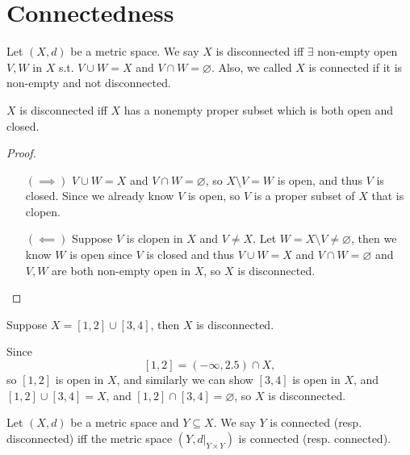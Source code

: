 \section{Connectedness}
\begin{definition} \label{def: disconnected/connected}
    Let \((X, d)\) be a metric space. We say \(X\) is disconnected iff \(\exists \) non-empty open \(V, W\) in \(X\) s.t. \(V \cup W = X\) and \(V \cap W = \varnothing \). Also, we called \(X\) is connected if it is non-empty and not disconnected.       
\end{definition}

\begin{remark}
    \(X\) is disconnected iff \(X\) has a nonempty proper subset which is both open and closed.  
\end{remark}
\begin{proof}
    \vphantom{text}
    \begin{itemize}
        \item [\((\implies )\)] \(V \cup W = X\) and \(V \cap W = \varnothing \), so \(X \setminus V = W\) is open, and thus \(V\) is closed. Since we already know \(V\) is open, so \(V\) is a proper subset of \(X\) that is clopen. 
        \item [\((\impliedby )\)] Suppose \(V\) is clopen in \(X\) and \(V \neq X\). Let \(W = X \setminus V \neq \varnothing \), then we know \(W\) is open since \(V\) is closed and thus \(V \cup W = X\) and \(V \cap W = \varnothing \) and \(V, W\) are both non-empty open in \(X\), so \(X\) is disconnected.               
    \end{itemize}
\end{proof}

\begin{eg}
    Suppose \(X = [1, 2] \cup [3, 4]\), then \(X\) is disconnected.  
\end{eg}
\begin{explanation}
    Since 
    \[
        [1, 2] = (-\infty , 2.5) \cap X,
    \] so \([1, 2]\) is open in \(X\), and similarly we can show \([3, 4]\) is open in \(X\), and \([1, 2] \cup [3, 4] = X\), and \([1, 2] \cap [3, 4] = \varnothing \), so \(X\) is disconnected.       
\end{explanation}

\begin{definition}
    Let \((X, d)\) be a metric space and \(Y \subseteq X\). We say \(Y\) is connected (resp. disconnected) iff the metric space \(\left( Y, d \vert_{Y \times Y} \right) \) is connected (resp. connected).    
\end{definition}

